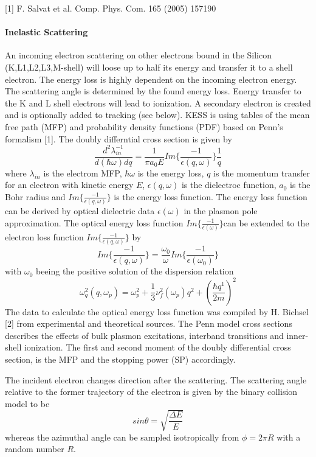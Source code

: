 \mbox{[}1\mbox{]} F. Salvat et al. Comp. Phys. Com. 165 (2005) 157190\hypertarget{_k_e_s_s_physics_inelastic}{}\paragraph{Inelastic Scattering}\label{_k_e_s_s_physics_inelastic}
An incoming electron scattering on other electrons bound in the Silicon (K,L1,L2,L3,M-\/shell) will loose up to half its energy and transfer it to a shell electron. The energy loss is highly dependent on the incoming electron energy. The scattering angle is determined by the found energy loss. Energy transfer to the K and L shell electrons will lead to ionization. A secondary electron is created and is optionally added to tracking (see below). KESS is using tables of the mean free path (MFP) and probability density functions (PDF) based on Penn's formalism \mbox{[}1\mbox{]}. The doubly differntial cross section is given by \[\frac{d^2 \lambda_{in}^{-1}}{d(\hbar \omega)dq} = \frac{1}{\pi a_0 E} Im \{ \frac{-1} {\epsilon(q,\omega)}\} \frac{1}{q}\] where $ \lambda_{in}$ is the electrom MFP, $ \hbar \omega$ is the energy loss, $ q$ is the momentum transfer for an electron with kinetic energy $ E $, $ \epsilon(q,\omega)$ is the dielectroc function, $ a_0$ is the Bohr radius and $ Im \{ \frac{-1} {\epsilon(q,\omega)}\} $ is the energy loss function. The energy loss function can be derived by optical dielectric data $ \epsilon(\omega) $ in the plasmon pole approximation. The optical energy loss function $ Im \{ \frac{-1} {\epsilon(\omega)}\} $can be extended to the electron loss function $ Im \{ \frac{-1} {\epsilon(q,\omega)}\} $ by \[ Im \{ \frac{-1} {\epsilon(q,\omega)}\} = \frac{\omega_0}{\omega} Im \{ \frac{-1} {\epsilon(\omega_0)}\} \] with $ \omega_0$ beeing the positive solution of the dispersion relation \[\omega_q^2(q,\omega_p)=\omega_p^2+\frac{1}{3} \nu_f^2(\omega_p)q^2+(\frac{\hbar q^1}{2m})^2 \] The data to calculate the optical energy loss function was compiled by H. Bichsel \mbox{[}2\mbox{]} from experimental and theoretical sources. The Penn model cross sections describes the effects of bulk plasmon excitations, interband transitions and inner-\/shell ionization. The first and second moment of the doubly differential cross section, is the MFP and the stopping power (SP) accordingly.

The incident electron changes direction after the scattering. The scattering angle relative to the former trajectory of the electron is given by the binary collision model to be \[ sin \theta = \sqrt{\frac{\Delta E}{E} } \] whereas the azimuthal angle can be sampled isotropically from $ \phi = 2\pi R$ with a random number $R $.

